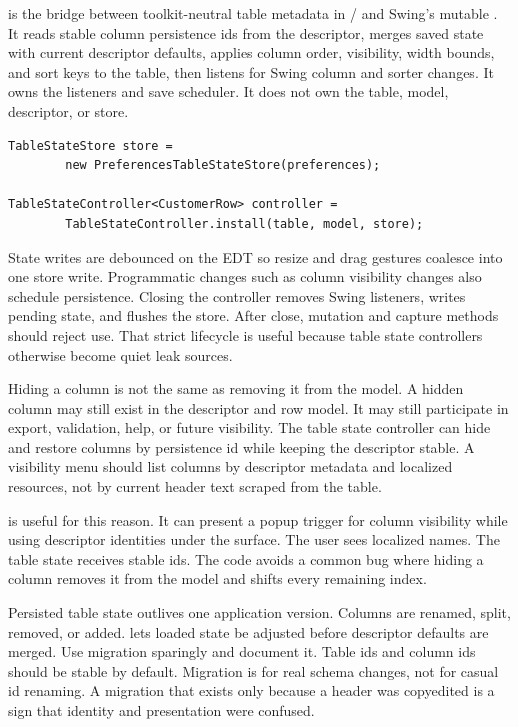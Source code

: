  is the bridge between toolkit-neutral table
metadata in / and Swing's mutable
. It reads stable column persistence ids from the
 descriptor, merges saved state with current
descriptor defaults, applies column order, visibility, width bounds, and sort
keys to the table, then listens for Swing column and sorter changes. It owns
the listeners and save scheduler. It does not own the table, model,
descriptor, or store.

\begin{lstlisting}[caption={Installing persisted table state.}]
TableStateStore store =
        new PreferencesTableStateStore(preferences);

TableStateController<CustomerRow> controller =
        TableStateController.install(table, model, store);
\end{lstlisting}

State writes are debounced on the EDT so resize and drag gestures coalesce
into one store write. Programmatic changes such as column visibility changes
also schedule persistence. Closing the controller removes Swing listeners,
writes pending state, and flushes the store. After close, mutation and capture
methods should reject use. That strict lifecycle is useful because table state
controllers otherwise become quiet leak sources.

Hiding a column is not the same as removing it from the model. A hidden column
may still exist in the descriptor and row model. It may still participate in
export, validation, help, or future visibility. The table state controller can
hide and restore columns by persistence id while keeping the descriptor
stable. A visibility menu should list columns by descriptor metadata and
localized resources, not by current header text scraped from the table.

 is useful for this reason. It can present
a popup trigger for column visibility while using descriptor identities under
the surface. The user sees localized names. The table state receives stable
ids. The code avoids a common bug where hiding a column removes it from the
model and shifts every remaining index.

Persisted table state outlives one application version. Columns are renamed,
split, removed, or added.  lets loaded state be
adjusted before descriptor defaults are merged. Use migration sparingly and
document it. Table ids and column ids should be stable by default. Migration
is for real schema changes, not for casual id renaming. A migration that
exists only because a header was copyedited is a sign that identity and
presentation were confused.

